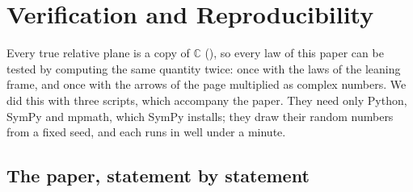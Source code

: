 \documentclass[11pt,a4paper]{amsart}
\theoremstyle{plain}
\theoremstyle{definition}
\theoremstyle{remark}
\newcommand{\C}{\mathbb{C}}
\begin{document}
\section{Verification and Reproducibility}\label{sec:verify}

Every true relative plane is a copy of $\C$ (), so every law of this paper can be tested by computing the same quantity twice: once with the laws of the leaning frame, and once with the arrows of the page multiplied as complex numbers. We did this with three scripts, which accompany the paper. They need only Python, SymPy \citep{Meurer2017} and mpmath, which SymPy installs; they draw their random numbers from a fixed seed, and each runs in well under a minute.

\subsection{The paper, statement by statement}
\end{document}
